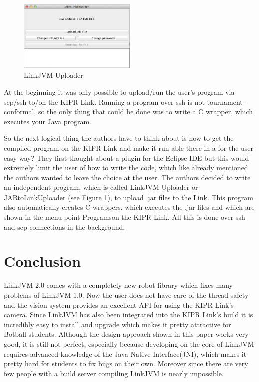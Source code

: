 \documentclass{juniorjournal}
\begin{document}
\begin{figure}[H]
\centering
\includegraphics[width=0.5\textwidth]{images/linkjvm_uploader.jpg}
\caption{LinkJVM-Uploader}
\label{fig:linkjvm_uploader}
\end{figure}

At the beginning it was only possible to upload/run the user's program via scp/ssh to/on the KIPR\cite{KIPR} Link\cite{link}.
Running a program over ssh is not tournament-conformal, so the only thing that could be done
was to write a C wrapper, which executes your Java program.

So the next logical thing the authors have to think about is how to get the compiled
program on the KIPR Link and make it run able there in a for the user easy way?
They first thought about a plugin for the Eclipse IDE but this would extremely
limit the user of how to write the code, which like already mentioned the
authors wanted to leave the choice at the user.
The authors decided to write an independent program, which is called
LinkJVM-Uploader or JARtoLinkUploader (see Figure \ref{fig:linkjvm_uploader}),
to upload .jar files to the Link. This program also automatically creates C
wrappers, which executes the .jar files and which are shown in the menu point
\frqq Programs\flqq  on the KIPR Link. All this is done over ssh and scp connections in
the background.

\section{Conclusion}
LinkJVM 2.0 comes with a completely new robot library which fixes many problems of LinkJVM 1.0\cite{linkjvm1.0}.
Now the user does not have care of the thread safety and the vision system provides an excellent API for using the KIPR\cite{KIPR} Link's\cite{link} camera.
Since LinkJVM has also been integrated into the KIPR Link's build it is incredibly easy to install and upgrade which makes it pretty attractive for Botball students.
Although the design approach shown in this paper works very good, it is still not perfect,
especially because developing on the core of LinkJVM requires advanced knowledge
of the Java Native Interface(JNI), which makes it pretty hard for students to fix bugs on their own.
Moreover since there are very few people with a build server compiling LinkJVM is nearly impossible.
\end{document}
